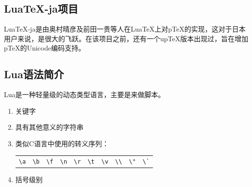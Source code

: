 \documentclass{article}
\begin{document}
\subsection{Lua\TeX -ja项目}
Lua\TeX -ja是由奥村晴彦及前田一贵等人在Lua\TeX 上对p\TeX 的实现，这对于日本用户来说，是很大的飞跃。在该项目之前，还有一个up\TeX 版本出现过，旨在增加p\TeX 的Unicode编码支持。
\subsection{Lua语法简介}
Lua是一种轻量级的动态类型语言，主要是来做脚本。
\begin{enumerate}
\item 关键字

\begin{table}[!ht]
\end{table}
\item 具有其他意义的字符串

\begin{table}[!ht]
\end{table}
\item 类似C语言中使用的转义序列：

\begin{table}[!ht]
\begin{center}
\begin{tabular}{llllllllll}
\verb!\a!&\verb!\b!&\verb!\f!&\verb!\n!&\verb!\r!&\verb!\t!&\verb!\v!&\verb|\\|&\verb!\"!&\verb!\`!\\
\end{tabular}
\end{center}
\end{table}
\item 括号级别


\end{enumerate}
\end{document}
